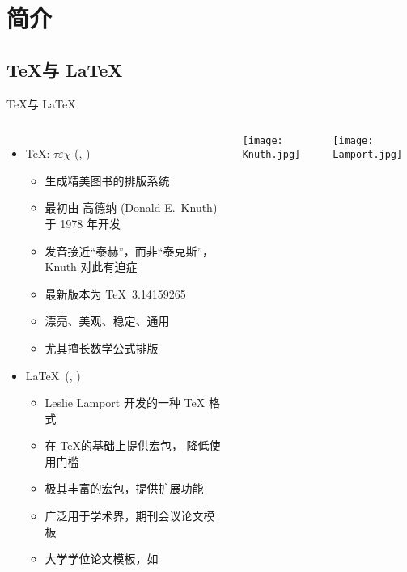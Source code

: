 
\section{简介}

\subsection{\TeX 与 \LaTeX}

\begin{frame}[fragile]{\TeX 与 \LaTeX}
  \begin{columns}[T]
    \begin{itemize}
      \item \TeX: $\tau\varepsilon\chi$ (,
        )
        \begin{itemize}
          \item 生成精美图书的排版系统
          \item 最初由 高德纳 (Donald E.~Knuth) 于 1978 年开发
          \item 发音接近``泰赫''，而非``泰克斯''，
            Knuth 对此有迫症
          \item 最新版本为 \TeX\ 3.14159265
          \item 漂亮、美观、稳定、通用
          \item 尤其擅长数学公式排版
        \end{itemize}
      \item \LaTeX\ (, )
        \begin{itemize}
          \item Leslie Lamport 开发的一种 \TeX{} 格式
          \item 在 \TeX 的基础上提供宏包， 降低使用门槛
          \item 极其丰富的宏包，提供扩展功能
          \item 广泛用于学术界，期刊会议论文模板
          \item 大学学位论文模板，如 \ThuThesis
        \end{itemize}
    \end{itemize}
    \texttt{[image: Knuth.jpg]}

    \texttt{[image: Lamport.jpg]}

  \end{columns}
\end{frame}

